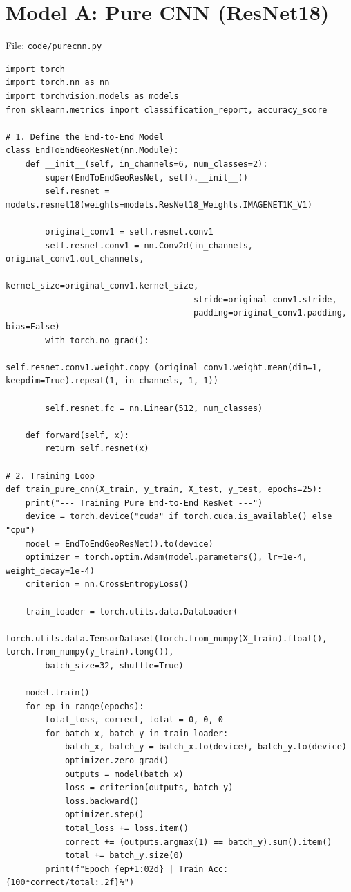 \documentclass[12pt,a4paper]{report}
\begin{document}
\section{Model A: Pure CNN (ResNet18)}
\begin{wiseNote}
File: \texttt{code/purecnn.py}
\end{wiseNote}
\lstset{style=wise,language=Python}
\begin{lstlisting}
import torch
import torch.nn as nn
import torchvision.models as models
from sklearn.metrics import classification_report, accuracy_score

# 1. Define the End-to-End Model
class EndToEndGeoResNet(nn.Module):
    def __init__(self, in_channels=6, num_classes=2):
        super(EndToEndGeoResNet, self).__init__()
        self.resnet = models.resnet18(weights=models.ResNet18_Weights.IMAGENET1K_V1)
        
        original_conv1 = self.resnet.conv1
        self.resnet.conv1 = nn.Conv2d(in_channels, original_conv1.out_channels,
                                      kernel_size=original_conv1.kernel_size,
                                      stride=original_conv1.stride,
                                      padding=original_conv1.padding, bias=False)
        with torch.no_grad():
            self.resnet.conv1.weight.copy_(original_conv1.weight.mean(dim=1, keepdim=True).repeat(1, in_channels, 1, 1))
        
        self.resnet.fc = nn.Linear(512, num_classes)

    def forward(self, x):
        return self.resnet(x)

# 2. Training Loop
def train_pure_cnn(X_train, y_train, X_test, y_test, epochs=25):
    print("--- Training Pure End-to-End ResNet ---")
    device = torch.device("cuda" if torch.cuda.is_available() else "cpu")
    model = EndToEndGeoResNet().to(device)
    optimizer = torch.optim.Adam(model.parameters(), lr=1e-4, weight_decay=1e-4)
    criterion = nn.CrossEntropyLoss()
    
    train_loader = torch.utils.data.DataLoader(
        torch.utils.data.TensorDataset(torch.from_numpy(X_train).float(), torch.from_numpy(y_train).long()),
        batch_size=32, shuffle=True)
    
    model.train()
    for ep in range(epochs):
        total_loss, correct, total = 0, 0, 0
        for batch_x, batch_y in train_loader:
            batch_x, batch_y = batch_x.to(device), batch_y.to(device)
            optimizer.zero_grad()
            outputs = model(batch_x)
            loss = criterion(outputs, batch_y)
            loss.backward()
            optimizer.step()
            total_loss += loss.item()
            correct += (outputs.argmax(1) == batch_y).sum().item()
            total += batch_y.size(0)
        print(f"Epoch {ep+1:02d} | Train Acc: {100*correct/total:.2f}%")
        

\end{lstlisting}
\end{document}
